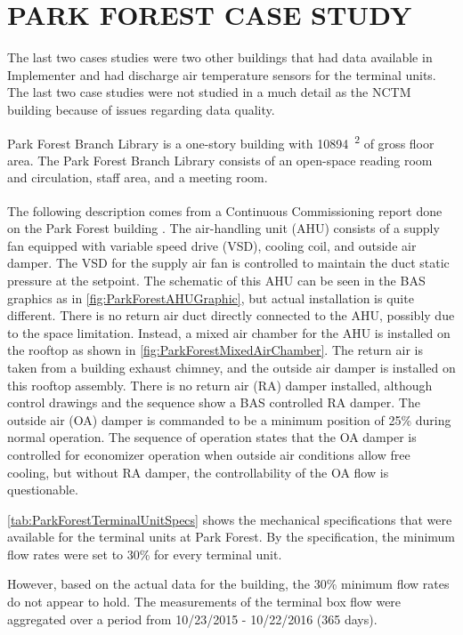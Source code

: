 \chapter{\texorpdfstring{\MakeUppercase{Park Forest Case Study}}{Park Forest Case Study}}

The last two cases studies were two other buildings that had data
available in Implementer and had discharge air temperature sensors for
the terminal units. The last two case studies were not studied in a much
detail as the NCTM building because of issues regarding data quality.

Park Forest Branch Library is a one-story building with
\SI{10894}{\feet\squared} of gross floor area. The Park Forest Branch
Library consists of an open-space reading room and circulation, staff
area, and a meeting room.

The following description comes from a Continuous
Commissioning\textsuperscript{\textregistered{}} report
done on the Park Forest building \cite{ParkForestReport}. The air-handling unit (AHU) consists
of a supply fan equipped with variable speed drive (VSD), cooling coil,
and outside air damper. The VSD for the supply air fan is controlled to
maintain the duct static pressure at the setpoint. The schematic of this AHU can
be seen in the BAS graphics as in \figref{}
\ref{fig:ParkForestAHUGraphic}, but actual installation is
quite different. There is no return air duct directly connected to the
AHU, possibly due to the space limitation. Instead, a mixed air chamber
for the AHU is installed on the rooftop as shown in \figref{}
\ref{fig:ParkForestMixedAirChamber}. The return
air is taken from a building exhaust chimney, and the outside air damper
is installed on this rooftop assembly. There is no return air (RA)
damper installed, although control drawings and the sequence show a
BAS controlled RA damper. The outside air (OA) damper is commanded to be
a minimum position of 25\% during normal operation. The sequence of
operation states that the OA damper is controlled for economizer
operation when outside air conditions allow free cooling, but without
RA damper, the controllability of the OA flow is questionable.

\tableref{} \ref{tab:ParkForestTerminalUnitSpecs} shows the
mechanical specifications that were available for the terminal units at
Park Forest. By the specification, the minimum flow rates were set to
30\% for every terminal unit. 

However, based on the actual data for the building, the 30\% minimum
flow rates do not appear to hold. The measurements of the terminal
box flow were aggregated over a period from 10/23/2015 - 10/22/2016
(365 days). 

